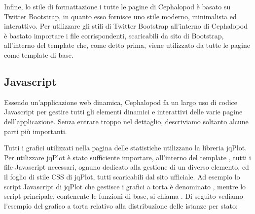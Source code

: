             Infine, lo stile di formattazione i tutte le pagine di Cephalopod è basato su Twitter Bootstrap, in quanto esso fornisce uno stile moderno, minimalista ed interattivo. Per utilizzare gli stili di Twitter Bootstrap all'interno di Cephalopod è bastato importare i file corrispondenti, scaricabili da sito di Bootstrap, all'interno del template  che, come detto prima, viene utilizzato da tutte le pagine come template di base.
            
        \subsection{Javascript} \label{subsec:it;di;javascript}
        
            Essendo un'applicazione web dinamica, Cephalopod fa un largo uso di codice Javascript per gestire tutti gli elementi dinamici e interattivi delle varie pagine dell'applicazione. Senza entrare troppo nel dettaglio, descriviamo soltanto alcune parti più importanti.
            
            Tutti i grafici utilizzati nella pagina delle statistiche utilizzano la libreria jqPlot. Per utilizzare jqPlot è stato sufficiente importare, all'interno del template , tutti i file Javascript necessari, ognuno dedicato alla gestione di un diverso elemento, ed il foglio di stile \ac{CSS} di jqPlot, tutti scaricabili dal sito ufficiale. Ad esempio lo script Javascript di jqPlot che gestisce i grafici a torta è denominato , mentre lo script principale, contenente le funzioni di base, si chiama . Di seguito vediamo l'esempio del grafico a torta relativo alla distribuzione delle istanze per stato:
            
